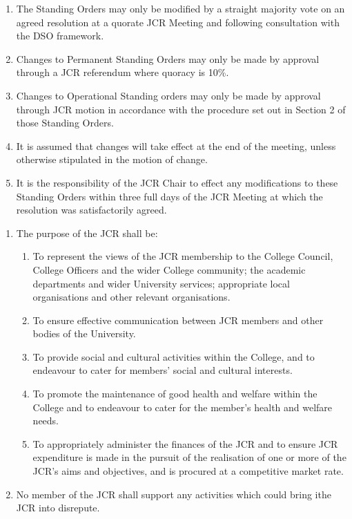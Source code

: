 \begin{enumerate}
    \item The Standing Orders may only be modified by a straight majority vote on an agreed resolution at a quorate JCR Meeting and following consultation with the DSO framework.
    \item Changes to Permanent Standing Orders may only be made by approval through a JCR referendum where quoracy is 10\%.
    \item Changes to Operational Standing orders may only be made by approval through JCR motion in accordance with the procedure set out in Section 2 of those Standing Orders. %
    \item It is assumed that changes will take effect at the end of the meeting, unless otherwise stipulated in the motion of change.
    \item It is the responsibility of the JCR Chair to effect any modifications to these Standing Orders within three full days of the JCR Meeting at which the resolution was satisfactorily agreed. %
\end{enumerate}

\begin{enumerate}
    \item The purpose of the JCR shall be:
    \begin{enumerate}
        \item To represent the views of the JCR membership to the College Council, College Officers and the wider College community; the academic departments and wider University services; appropriate local organisations and other relevant organisations.
        \item To ensure effective communication between JCR members and other bodies of the University.
        \item To provide social and cultural activities within the College, and to endeavour to cater for members’ social and cultural interests.
        \item To promote the maintenance of good health and welfare within the College and to endeavour to cater for the member’s health and welfare needs.
        \item To appropriately administer the finances of the JCR and to ensure JCR expenditure is made in the pursuit of the realisation of one or more of the JCR’s aims and objectives, and is procured at a competitive market rate.
    \end{enumerate}
    \item No member of the JCR shall support any activities which could bring ithe JCR into disrepute. %
\end{enumerate}

